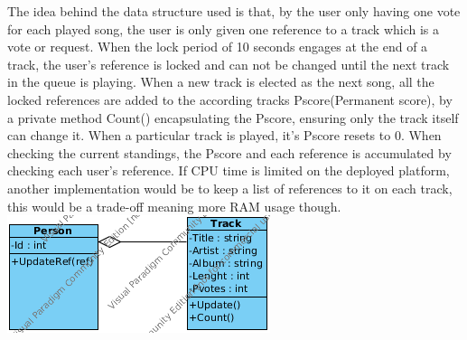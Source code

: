 The idea behind the data structure used is that, by the user only having one vote for each played song, the user is only given one reference to a track which is a vote or request. When the lock period of 10 seconds engages at the end of a track, the user's reference is locked and can not be changed until the next track in the queue is playing. When a new track is elected as the next song, all the locked references are added to the according tracks Pscore(Permanent score), by a private method Count() encapsulating the Pscore, ensuring only the track itself can change it. When a particular track is played, it's Pscore resets to 0. When checking the current standings, the Pscore and each reference is accumulated by checking each user's reference. If CPU time is limited on the deployed platform, another implementation would be to keep a list of references to it on each track, this would be a trade-off meaning more RAM usage though.
\includegraphics{Images/BackendDSv1.png}